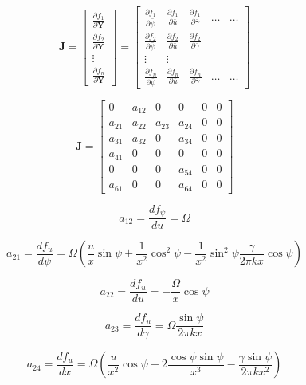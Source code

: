 \documentclass[12pt]{article}
\begin{document}
$$
\mathbf{J} = \begin{bmatrix}
  \frac{\partial f_1}{\partial \mathbf{Y}} \\[1ex]
  \frac{\partial f_2}{\partial \mathbf{Y}} \\[1ex] 
  \vdots \\[1ex] 
  \frac{\partial f_n}{\partial \mathbf{Y}}
\end{bmatrix}=%
\begin{bmatrix}
    \frac{\partial f_1}{\partial \bar{\psi}} & 
      \frac{\partial f_1}{\partial \bar{u}} & 
      \frac{\partial f_1}{\partial \bar{\gamma}} & \dots & \dots \\[1ex] %
    \frac{\partial f_2}{\partial \bar{\psi}} & 
      \frac{\partial f_2}{\partial \bar{u}} & 
      \frac{\partial f_2}{\partial \bar{\gamma}} \\[1ex]

      \vdots & \vdots \\[1ex]
      \frac{\partial f_n}{\partial\bar{\psi}} & 
      \frac{\partial f_n}{\partial \bar{u}} & 
      \frac{\partial f_n}{\partial \bar{\gamma}}& \dots & \dots
  \end{bmatrix}
$$



$$\mathbf{J} =%
\begin{bmatrix}
    0 & a_{12} & 0 & 0 & 0 & 0 \\[1ex]
    a_{21} & a_{22} & a_{23} & a_{24} & 0  & 0 \\[1ex]
    a_{31} & a_{32}& 0 & a_{34} & 0 & 0 \\[1ex]
    a_{41} & 0 & 0 & 0 & 0  & 0 \\[1ex]    
    0 & 0 & 0 &a_{54} & 0 & 0 \\[1ex]
    a_{61} & 0 & 0 & a_{64} & 0  & 0
  \end{bmatrix}
$$

$$
a_{12} = \frac{df_{\psi}}{du} = \Omega
$$

$$
a_{21} = \frac{df_{u}}{d\psi} = \Omega (\frac{u}{x} \sin \psi + \frac{1}{x^2} \cos^2 \psi - \frac{1}{x^2} \sin^2 \psi \frac{\gamma}{2 \pi k x } \cos \psi)
$$

$$
a_{22} = \frac{df_{u}}{du} = - \frac{\Omega}{x} \cos \psi
$$

$$
a_{23} = \frac{df_{u}}{d\gamma} = \Omega \frac{\sin \psi}{2 \pi k x}
$$

$$
a_{24} = \frac{df_{u}}{dx} = \Omega(\frac{u}{x^2}\cos \psi - 2\frac{\cos \psi \sin \psi}{x^3} - \frac{\gamma \sin \psi}{2 \pi k x^2})
$$
\end{document}
